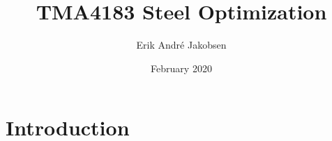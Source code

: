 \documentclass{article}
\title{TMA4183 Steel Optimization}
\author{Erik André Jakobsen}
\date{February 2020}
\begin{document}
\maketitle

\section{Introduction}
\end{document}
